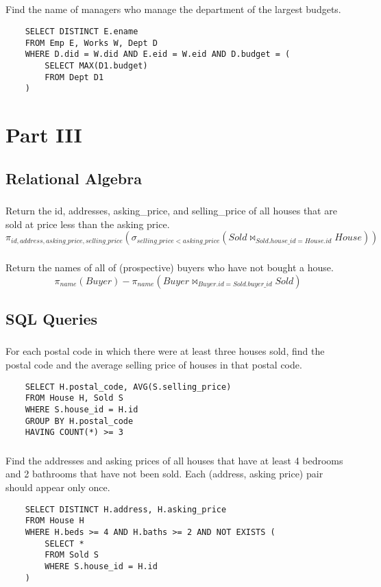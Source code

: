 \documentclass{article}
\begin{document}
\subsection{}
Find the name of managers who manage the department of the largest budgets.
\begin{verbatim}
    SELECT DISTINCT E.ename
    FROM Emp E, Works W, Dept D
    WHERE D.did = W.did AND E.eid = W.eid AND D.budget = (
        SELECT MAX(D1.budget)
        FROM Dept D1
    )
\end{verbatim}

\section{Part III}
\subsection{Relational Algebra}
\subsubsection{}
Return the id, addresses, asking\_price, and selling\_price of all houses that are sold at price less than the asking price.
$$\pi_{id,address,asking\_price,selling\_price}(\sigma_{selling\_price < asking\_price}(Sold \bowtie_{Sold.house\_id=House.id}House))$$
\subsubsection{}
Return the names of all of (prospective) buyers who have not bought a house.
$$\pi_{name}(Buyer)-\pi_{name}(Buyer \bowtie_{Buyer.id=Sold.buyer\_id}Sold)$$

\newpage

\subsection{SQL Queries}
\subsubsection{}
For each postal code in which there were at least three houses sold, find the postal code and the  average selling price of houses in that postal code.
\begin{verbatim}
    SELECT H.postal_code, AVG(S.selling_price)
    FROM House H, Sold S
    WHERE S.house_id = H.id
    GROUP BY H.postal_code
    HAVING COUNT(*) >= 3
\end{verbatim}

\subsubsection{}
Find the addresses and asking prices of all houses that have at least 4 bedrooms and 2 bathrooms that have not been sold. Each (address, asking price) pair should appear only once.
\begin{verbatim}
    SELECT DISTINCT H.address, H.asking_price
    FROM House H
    WHERE H.beds >= 4 AND H.baths >= 2 AND NOT EXISTS (
        SELECT *
        FROM Sold S
        WHERE S.house_id = H.id
    )
\end{verbatim}
\end{document}
